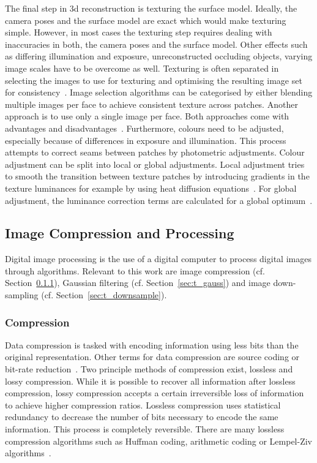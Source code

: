 The final step in \gls{3d} reconstruction is texturing the surface model. Ideally, the camera poses and the surface model are exact which would make texturing simple. However, in most cases the texturing step requires dealing with inaccuracies in both, the camera poses and the surface model. Other effects such as differing illumination and exposure, unreconstructed occluding objects, varying image scales have to be overcome as well. Texturing is often separated in selecting the images to use for texturing and optimising the resulting image set for consistency~\cite{Waechter2014LetReconstructions}.
Image selection algorithms can be categorised by either blending multiple images per face to achieve consistent texture across patches. Another approach is to use only a single image per face. Both approaches come with advantages and disadvantages~\cite{Waechter2014LetReconstructions}.
Furthermore, colours need to be adjusted, especially because of differences in exposure and illumination. This process attempts to correct seams between patches by photometric adjustments. Colour adjustment can be split into local or global adjustments. Local adjustment tries to smooth the transition between texture patches by introducing gradients in the texture luminances for example by using heat diffusion equations~\cite{Velho2007ProjectivePhotography}. For global adjustment, the luminance correction terms are calculated for a global optimum~\cite{Lempitsky2007SeamlessMaps}.

\subsection{Image Compression and Processing}
Digital image processing is the use of a digital computer to process digital images through algorithms. Relevant to this work are image compression (cf. Section~\ref{sec:t_compress}), Gaussian filtering  (cf. Section~\ref{sec:t_gauss}) and image down-sampling  (cf. Section~\ref{sec:t_downsample}).

\subsubsection{Compression} \label{sec:t_compress}
Data compression is tasked with encoding information using less bits than the original representation. Other terms for data compression are source coding or bit-rate reduction~\cite{Mahdi2012ImplementingTechnique}. Two principle methods of compression exist, lossless and lossy compression. While it is possible to recover all information after lossless compression, lossy compression accepts a certain irreversible loss of information to achieve higher compression ratios.
Lossless compression uses statistical redundancy to decrease the number of bits necessary to encode the same information. This process is completely reversible. There are many lossless compression algorithms such as Huffman coding, arithmetic coding or Lempel-Ziv algorithms~\cite{Bocharova2009CompressionMultimedia}.

